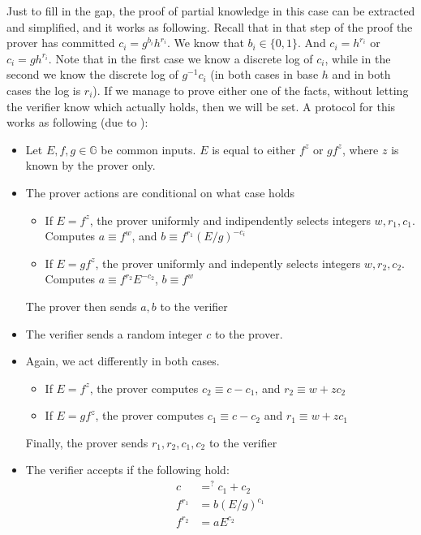\documentclass{article}
\begin{document}
Just to fill in the gap, the proof of partial knowledge in this case can be extracted and simplified, and it works as following. 
Recall that in that step of the proof the prover has committed $c_i = g^{b_i} h^{r_i}$. We know that $b_i \in \{ 0, 1 \}$. And $c_i = h^{r_i}$ or $c_i = g h^{r_i}$.
Note that in the first case we know a discrete log of $c_i$, while in the second we know the discrete log of $g^{-1} c_i$ (in both cases in base $h$ and in both cases the log is $r_i$). 
If we manage to prove either one of the facts, without letting the verifier know which actually holds, then we will be set. 
A protocol for this works as following (due to \cite{maoGuaranteedCorrectSharing1998b}):
\begin{itemize}
    \item Let $E, f, g \in \mathbb{G}$ be common inputs. $E$ is equal to either $f^z$ or $g f^z$, where $z$ is known by the prover only.
    \item The prover actions are conditional on what case holds
    \begin{itemize}
        \item If $E = f^z$, the prover uniformly and indipendently selects integers $w, r_1, c_1$. Computes $a \equiv f^w$, and $b \equiv f^{r_1}(E/g)^{-c_i}$
        \item If $E = g f^z$, the prover uniformly and indepently selects integers $w, r_2, c_2$. Computes $a \equiv f^{r_2} E^{-c_2}$, $b \equiv f^w$
    \end{itemize}
    The prover then sends $a, b$ to the verifier
    \item The verifier sends a random integer $c$ to the prover.
    \item Again, we act differently in both cases.
    \begin{itemize}
        \item If $E = f^z$, the prover computes $c_2 \equiv c - c_1$, and $r_2 \equiv w + z c_2$
        \item If $E = g f^z$, the prover computes $c_1 \equiv c - c_2$ and $r_1 \equiv w + z c_1$ 
    \end{itemize}
    Finally, the prover sends $r_1, r_2, c_1, c_2$ to the verifier
    \item The verifier accepts if the following hold:
    \begin{align*}
        c &=^? c_1 + c_2 \\
        f^{r_1} &= b(E/g)^{c_1} \\
        f^{r_2} &= a E^{c_2}
    \end{align*}
\end{itemize}
\end{document}
